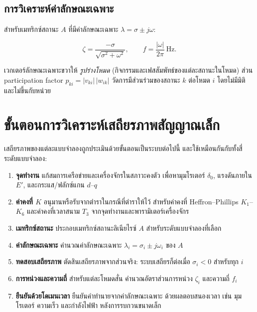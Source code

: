 \documentclass[12pt,a4paper]{article}
\begin{document}
\subsection{การวิเคราะห์ค่าลักษณะเฉพาะ}

สำหรับเมทริกซ์สถานะ $A$ ที่มีค่าลักษณะเฉพาะ $\lambda = \sigma \pm j\omega$:

\begin{equation}
\zeta = \frac{-\sigma}{\sqrt{\sigma^2+\omega^2}},
\qquad
f = \frac{|\omega|}{2\pi}\ \text{Hz}.
\end{equation}

เวกเตอร์ลักษณะเฉพาะขวาให้ \textit{รูปร่างโหมด} (กิจกรรมและเฟสสัมพัทธ์ของแต่ละสถานะในโหมด)
ส่วน participation factor $p_{ki} = |v_{ki}|\,|w_{ik}|$
วัดการมีส่วนร่วมของสถานะ $k$ ต่อโหมด $i$ โดยไม่มีมิติและไม่ขึ้นกับหน่วย

\section{ขั้นตอนการวิเคราะห์เสถียรภาพสัญญาณเล็ก}
\label{sec:procedure}

เสถียรภาพของแต่ละแบบจำลองถูกประเมินด้วยขั้นตอนเป็นระบบต่อไปนี้
และใช้เหมือนกันกับทั้งสี่ระดับแบบจำลอง:

\begin{enumerate}
    \item \textbf{จุดทำงาน} แก้สมการเครือข่ายและเครื่องจักรในสภาวะคงตัว
          เพื่อหามุมโรเตอร์ $\delta_0$, แรงดันภายใน $E'$,
          และกระแส/ฟลักซ์แกน $d$--$q$
    \item \textbf{ค่าคงที่ $K$} อนุมานหรือรับจากตำราในกรณีที่ตำราให้ไว้
          สำหรับค่าคงที่ Heffron--Phillips $K_1$--$K_6$
          และค่าคงที่เวลาสนาม $T_3$ จากจุดทำงานและพารามิเตอร์เครื่องจักร
    \item \textbf{เมทริกซ์สถานะ} ประกอบเมทริกซ์สถานะลิเนียไรซ์ $A$
          สำหรับระดับแบบจำลองที่เลือก
    \item \textbf{ค่าลักษณะเฉพาะ} คำนวณค่าลักษณะเฉพาะ
          $\lambda_i = \sigma_i \pm j\omega_i$ ของ $A$
    \item \textbf{ทดสอบเสถียรภาพ} ตัดสินเสถียรภาพจากส่วนจริง:
          ระบบเสถียรก็ต่อเมื่อ $\sigma_i < 0$ สำหรับทุก $i$
    \item \textbf{การหน่วงและความถี่} สำหรับแต่ละโหมดสั่น คำนวณอัตราส่วนการหน่วง
          $\zeta_i$ และความถี่ $f_i$
    \item \textbf{ยืนยันด้วยโดเมนเวลา} ยืนยันคำทำนายจากค่าลักษณะเฉพาะ
          ด้วยผลตอบสนองเวลา เช่น มุมโรเตอร์ ความเร็ว และกำลังไฟฟ้า
          หลังการรบกวนขนาดเล็ก
\end{enumerate}
\end{document}
